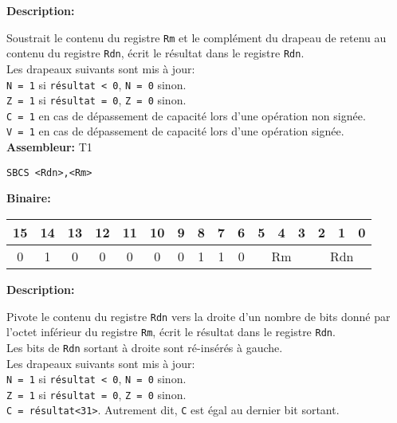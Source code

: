 \label{subsubsubsec:SBC}

\textbf{Description: }

Soustrait le contenu du registre \texttt{Rm} et le complément du drapeau de retenu au contenu du registre \texttt{Rdn}, écrit le résultat dans le registre \texttt{Rdn}.\\
Les drapeaux suivants sont mis à jour:\\
\texttt{N = 1} si \texttt{résultat < 0}, \texttt{N = 0} sinon.\\
\texttt{Z = 1} si \texttt{résultat = 0}, \texttt{Z = 0} sinon.\\
\texttt{C = 1} en cas de dépassement de capacité lors d'une opération non signée.\\
\texttt{V = 1} en cas de dépassement de capacité lors d'une opération signée.\\

\textbf{Assembleur:} T1

\begin{lstlisting}
SBCS <Rdn>,<Rm>
\end{lstlisting}

\textbf{Binaire:}\\

\begin{tabular}{| c c c c c c c c c c c c c c c c |}
\hline
15 & 14 & 13 & 12 & 11 & 10 & \multicolumn{1}{|c}{9} & 8 & 7 & 6 & \multicolumn{1}{|c}{5} & 4 & 3 & \multicolumn{1}{|c}{2} & 1 & 0 \\
\hline
0 & 1 & 0 & 0 & 0 & 0 & \multicolumn{1}{|c}{0} & 1 & 1 & 0 & \multicolumn{3}{|c}{Rm} & \multicolumn{3}{|c|}{Rdn} \\
\hline
\end{tabular}




\textbf{Description: }

Pivote le contenu du registre \texttt{Rdn} vers la droite d'un nombre de bits donné par l'octet inférieur du registre \texttt{Rm}, écrit le résultat dans le registre \texttt{Rdn}.\\
Les bits de \texttt{Rdn} sortant à droite sont ré-insérés à gauche.\\
Les drapeaux suivants sont mis à jour:\\
\texttt{N = 1} si \texttt{résultat < 0}, \texttt{N = 0} sinon.\\
\texttt{Z = 1} si \texttt{résultat = 0}, \texttt{Z = 0} sinon.\\
\texttt{C = résultat<31>}. Autrement dit, \texttt{C} est égal au dernier bit sortant.\\

